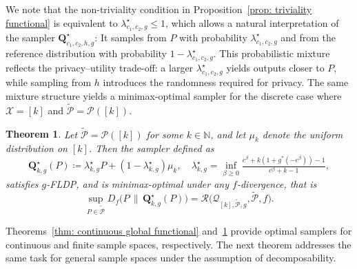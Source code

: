\documentclass[accepted]{article}
\theoremstyle{plain} %
\newtheorem{theorem}{Theorem}[section]
\theoremstyle{definition}
\theoremstyle{remark}
\newcommand{\bQ}{\mathbf{Q}}
\begin{document}
We note that the non-triviality condition in Proposition~\ref{prop: triviality functional} is equivalent to \( \lambda_{c_1,c_2,g}^\star \leq 1 \), which allows a natural interpretation of the sampler $\mathbf{Q}_{c_1,c_2,h,g}^\star$: It samples from \( P \) with probability \( \lambda_{c_1,c_2,g}^\star \) and from the reference distribution with probability \(1- \lambda_{c_1,c_2,g}^\star \). This probabilistic mixture reflects the privacy–utility trade-off: a larger $ \lambda^\star_{c_1, c_2, g} $ yields outputs closer to $ P $, while sampling from $ h $ introduces the randomness required for privacy.
The same mixture structure yields a minimax-optimal sampler for the discrete case where \( \mathcal{X} = [k] \) and \( \tilde{\mathcal{P}} = \mathcal{P}([k]) \).
\begin{theorem}\label{thm: discrete global functional}
Let \( \tilde{\mathcal{P}} = \mathcal{P}([k]) \) for some \( k \in \mathbb{N} \), and let \( \mu_k \) denote the uniform distribution on \([k]\). Then the sampler defined as
\[
\bQ^\star_{k,g}(P) \coloneqq \lambda^\star_{k,g} P + (1 - \lambda^\star_{k,g}) \mu_k, \quad 
\lambda^\star_{k,g} = \inf_{\beta \geq 0} 
\tfrac{e^\beta + k ( 1 + g^*(-e^\beta)) - 1}
     {e^\beta + k - 1},
\]
satisfies $g$-FLDP, and is minimax-optimal under any \( f \)-divergence, that is
\[
\sup_{P \in \tilde{\mathcal{P}}} D_f\big(P \,\|\, \bQ^\star_{k,g}(P)\big)
= \mathcal{R}\big(\mathcal{Q}_{[k], \tilde{\mathcal{P}}, g}, \tilde{\mathcal{P}}, f\big).
\]
\end{theorem}




Theorems~\ref{thm: continuous global functional} and~\ref{thm: discrete global functional} provide optimal samplers for continuous and finite sample spaces, respectively. The next theorem addresses the same task for general sample spaces under the assumption of decomposability.
 
\end{document}
